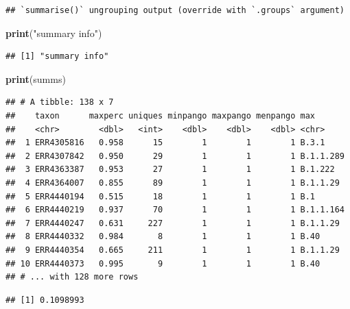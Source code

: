 \documentclass[
]{article}
\newenvironment{Shaded}{\begin{snugshade}}{\end{snugshade}}
\newcommand{\DecValTok}[1]{\textcolor[rgb]{0.00,0.00,0.81}{#1}}
\newcommand{\KeywordTok}[1]{\textcolor[rgb]{0.13,0.29,0.53}{\textbf{#1}}}
\newcommand{\NormalTok}[1]{#1}
\newcommand{\OperatorTok}[1]{\textcolor[rgb]{0.81,0.36,0.00}{\textbf{#1}}}
\newcommand{\StringTok}[1]{\textcolor[rgb]{0.31,0.60,0.02}{#1}}
\begin{document}
\begin{verbatim}
## `summarise()` ungrouping output (override with `.groups` argument)
\end{verbatim}

\begin{Shaded}
\begin{Highlighting}[]
\KeywordTok{print}\NormalTok{(}\StringTok{"summary info"}\NormalTok{)}
\end{Highlighting}
\end{Shaded}

\begin{verbatim}
## [1] "summary info"
\end{verbatim}

\begin{Shaded}
\begin{Highlighting}[]
\KeywordTok{print}\NormalTok{(summs)}
\end{Highlighting}
\end{Shaded}

\begin{verbatim}
## # A tibble: 138 x 7
##    taxon      maxperc uniques minpango maxpango menpango max      
##    <chr>        <dbl>   <int>    <dbl>    <dbl>    <dbl> <chr>    
##  1 ERR4305816   0.958      15        1        1        1 B.3.1    
##  2 ERR4307842   0.950      29        1        1        1 B.1.1.289
##  3 ERR4363387   0.953      27        1        1        1 B.1.222  
##  4 ERR4364007   0.855      89        1        1        1 B.1.1.29 
##  5 ERR4440194   0.515      18        1        1        1 B.1      
##  6 ERR4440219   0.937      70        1        1        1 B.1.1.164
##  7 ERR4440247   0.631     227        1        1        1 B.1.1.29 
##  8 ERR4440332   0.984       8        1        1        1 B.40     
##  9 ERR4440354   0.665     211        1        1        1 B.1.1.29 
## 10 ERR4440373   0.995       9        1        1        1 B.40     
## # ... with 128 more rows
\end{verbatim}

\begin{Shaded}
\end{Shaded}

\begin{verbatim}
## [1] 0.1098993
\end{verbatim}
\end{document}
